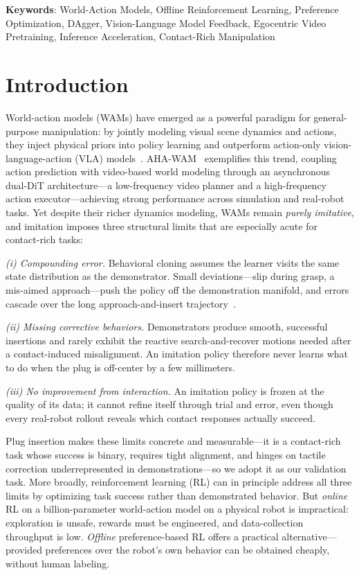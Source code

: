 \documentclass[letterpaper, 10pt, conference]{ieeeconf}
\begin{document}
\textbf{Keywords}: World-Action Models, Offline Reinforcement Learning, Preference Optimization, DAgger, Vision-Language Model Feedback, Egocentric Video Pretraining, Inference Acceleration, Contact-Rich Manipulation

\section{Introduction}
\label{sec:introduction}

World-action models (WAMs) have emerged as a powerful paradigm for general-purpose manipulation: by jointly modeling visual scene dynamics and actions, they inject physical priors into policy learning and outperform action-only vision-language-action (VLA) models~\cite{zitkovich2023rt,mees2024octo,cadene2026lerobot,black2025pi_}. AHA-WAM~\cite{ahawam} exemplifies this trend, coupling action prediction with video-based world modeling through an asynchronous dual-DiT architecture---a low-frequency video planner and a high-frequency action executor---achieving strong performance across simulation and real-robot tasks. Yet despite their richer dynamics modeling, WAMs remain \emph{purely imitative}, and imitation imposes three structural limits that are especially acute for contact-rich tasks:

\textit{(i) Compounding error.} Behavioral cloning assumes the learner visits the same state distribution as the demonstrator. Small deviations---slip during grasp, a mis-aimed approach---push the policy off the demonstration manifold, and errors cascade over the long approach-and-insert trajectory~\cite{ross2011dagger}.

\textit{(ii) Missing corrective behaviors.} Demonstrators produce smooth, successful insertions and rarely exhibit the reactive search-and-recover motions needed after a contact-induced misalignment. An imitation policy therefore never learns what to do when the plug is off-center by a few millimeters.

\textit{(iii) No improvement from interaction.} An imitation policy is frozen at the quality of its data; it cannot refine itself through trial and error, even though every real-robot rollout reveals which contact responses actually succeed.

Plug insertion makes these limits concrete and measurable---it is a contact-rich task whose success is binary, requires tight alignment, and hinges on tactile correction underrepresented in demonstrations---so we adopt it as our validation task. More broadly, reinforcement learning (RL) can in principle address all three limits by optimizing task success rather than demonstrated behavior. But \emph{online} RL on a billion-parameter world-action model on a physical robot is impractical: exploration is unsafe, rewards must be engineered, and data-collection throughput is low. \emph{Offline} preference-based RL offers a practical alternative---provided preferences over the robot's own behavior can be obtained cheaply, without human labeling.
\end{document}

